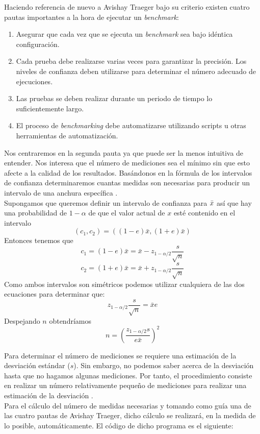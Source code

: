 Haciendo referencia de nuevo a Avishay Traeger bajo su criterio existen cuatro pautas importantes \cite{traeger} a la hora de ejecutar un \textit{benchmark}: 

\begin{enumerate}
    \item Asegurar que cada vez que se ejecuta un \textit{benchmark} sea bajo idéntica configuración.
    \item Cada prueba debe realizarse varias veces para garantizar la precisión. Los niveles de confianza deben utilizarse para determinar el número adecuado de ejecuciones.
    \item Las pruebas se deben realizar durante un periodo de tiempo lo suficientemente largo.
    \item El proceso de \textit{benchmarking} debe automatizarse utilizando scripts u otras herramientas de automatización.
\end{enumerate}

Nos centraremos en la segunda pauta ya que puede ser la menos intuitiva de entender. Nos interesa que el número de mediciones sea el mínimo sin que esto afecte a la calidad de los resultados. Basándonos en la fórmula de los intervalos de confianza determinaremos cuantas medidas son necesarias para producir un intervalo de una anchura específica \cite{lilja_2000}. \\

Supongamos que queremos definir un intervalo de confianza para $\Bar{x}$ así que hay una probabilidad de $1-\alpha$ de que el valor actual de $x$ esté contenido en el intervalo  $$
\left(c_{1}, c_{2}\right)=((1-e) \bar{x},(1+e) \bar{x})
$$ 
Entonces tenemos que 
$$
c_{1}=(1-e) \bar{x}=\bar{x}-z_{1-\alpha / 2} \frac{s}{\sqrt{n}}
$$
$$
c_{2}=(1+e) \bar{x}=\bar{x}+z_{1-\alpha / 2} \frac{s}{\sqrt{n}}
$$
Como ambos intervalos son simétricos podemos utilizar cualquiera de las dos ecuaciones para determinar que:
$$
z_{1-\alpha / 2} \frac{s}{\sqrt{n}}=\bar{x} e
$$
Despejando $n$ obtendríamos
$$
n=\left(\frac{z_{1-\alpha / 2} s}{e \bar{x}}\right)^{2}
$$ 

Para determinar el número de mediciones se requiere una estimación de la desviación estándar ($s$). Sin embargo, no podemos saber acerca de la desviación hasta que no hagamos algunas mediciones. Por tanto, el procedimiento consiste en realizar un número relativamente pequeño de mediciones para realizar una estimación de la desviación \cite{lilja_2000}. \\ 

Para el cálculo del número de medidas necesarias y tomando como guía una de las cuatro pautas de Avishay Traeger, dicho cálculo se realizará, en la medida de lo posible, automáticamente. El código de dicho programa es el siguiente:  

